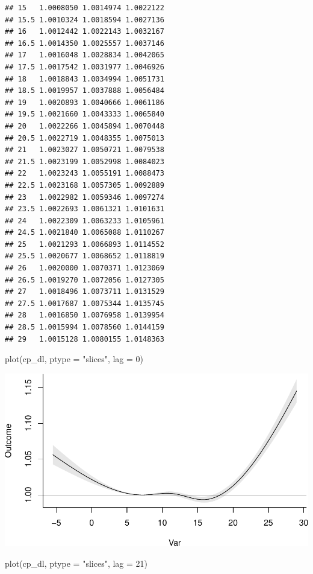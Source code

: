 \documentclass[
]{book}
\newenvironment{Shaded}{\begin{snugshade}}{\end{snugshade}}
\newcommand{\AttributeTok}[1]{\textcolor[rgb]{0.77,0.63,0.00}{#1}}
\newcommand{\DecValTok}[1]{\textcolor[rgb]{0.00,0.00,0.81}{#1}}
\newcommand{\FunctionTok}[1]{\textcolor[rgb]{0.00,0.00,0.00}{#1}}
\newcommand{\NormalTok}[1]{#1}
\newcommand{\StringTok}[1]{\textcolor[rgb]{0.31,0.60,0.02}{#1}}
\begin{document}
\begin{verbatim}
## 15   1.0008050 1.0014974 1.0022122
## 15.5 1.0010324 1.0018594 1.0027136
## 16   1.0012442 1.0022143 1.0032167
## 16.5 1.0014350 1.0025557 1.0037146
## 17   1.0016048 1.0028834 1.0042065
## 17.5 1.0017542 1.0031977 1.0046926
## 18   1.0018843 1.0034994 1.0051731
## 18.5 1.0019957 1.0037888 1.0056484
## 19   1.0020893 1.0040666 1.0061186
## 19.5 1.0021660 1.0043333 1.0065840
## 20   1.0022266 1.0045894 1.0070448
## 20.5 1.0022719 1.0048355 1.0075013
## 21   1.0023027 1.0050721 1.0079538
## 21.5 1.0023199 1.0052998 1.0084023
## 22   1.0023243 1.0055191 1.0088473
## 22.5 1.0023168 1.0057305 1.0092889
## 23   1.0022982 1.0059346 1.0097274
## 23.5 1.0022693 1.0061321 1.0101631
## 24   1.0022309 1.0063233 1.0105961
## 24.5 1.0021840 1.0065088 1.0110267
## 25   1.0021293 1.0066893 1.0114552
## 25.5 1.0020677 1.0068652 1.0118819
## 26   1.0020000 1.0070371 1.0123069
## 26.5 1.0019270 1.0072056 1.0127305
## 27   1.0018496 1.0073711 1.0131529
## 27.5 1.0017687 1.0075344 1.0135745
## 28   1.0016850 1.0076958 1.0139954
## 28.5 1.0015994 1.0078560 1.0144159
## 29   1.0015128 1.0080155 1.0148363
\end{verbatim}

\begin{Shaded}
\begin{Highlighting}[]
\FunctionTok{plot}\NormalTok{(cp\_dl, }\AttributeTok{ptype =} \StringTok{"slices"}\NormalTok{, }\AttributeTok{lag =} \DecValTok{0}\NormalTok{)}
\end{Highlighting}
\end{Shaded}

\includegraphics{adv_epi_analysis_files/figure-latex/unnamed-chunk-104-1.pdf}

\begin{Shaded}
\begin{Highlighting}[]
\FunctionTok{plot}\NormalTok{(cp\_dl, }\AttributeTok{ptype =} \StringTok{"slices"}\NormalTok{, }\AttributeTok{lag =} \DecValTok{21}\NormalTok{)}
\end{Highlighting}
\end{Shaded}
\end{document}
